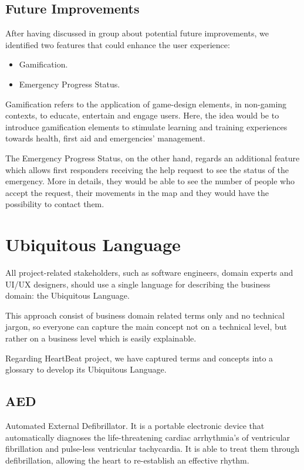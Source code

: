 \documentclass[11pt,a4paper]{article}
\begin{document}
\subsection{Future Improvements}
After having discussed in group about potential future improvements, we identified two features that could enhance the user experience:

\begin{itemize}
    \item Gamification.
    \item Emergency Progress Status.
\end{itemize}

Gamification refers to the application of game-design elements, in non-gaming contexts, to educate, entertain and engage users.
%
Here, the idea would be to introduce gamification elements to stimulate learning and training experiences towards health, first aid and emergencies' management.

The Emergency Progress Status, on the other hand, regards an additional feature which allows first responders receiving the help request to see the status of the emergency.
%
More in details, they would be able to see the number of people who accept the request, their movements in the map and they would have the possibility to contact them.

\section{Ubiquitous Language}

All project-related stakeholders, such as software engineers, domain experts and UI/UX designers, should use a single language for describing the business domain: the Ubiquitous Language. 

This approach consist of business domain related terms only and no technical jargon, so everyone can capture the main concept not on a technical level, but rather on a business level which is easily explainable. 

Regarding HeartBeat project, we have captured terms and concepts into a glossary to develop its Ubiquitous Language.

\subsection*{AED}
Automated External Defibrillator.
%
It is a portable electronic device that automatically diagnoses the life-threatening cardiac arrhythmia's of ventricular fibrillation and pulse-less ventricular tachycardia.
%
It is able to treat them through defibrillation, allowing the heart to re-establish an effective rhythm.
\end{document}

